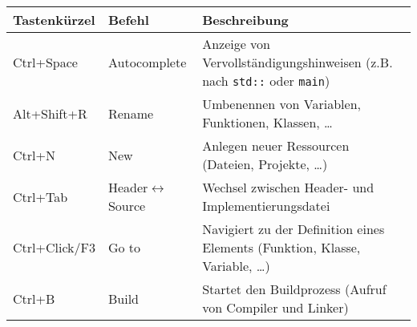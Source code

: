 \begin{tabular}{l|l|p{11.5cm}}
    \toprule
    \textbf{Tastenkürzel} & \textbf{Befehl} & \textbf{Beschreibung}\\
    \midrule
	Ctrl+Space & Autocomplete &
	Anzeige von Vervollständigungshinweisen (z.B. nach \texttt{std::} oder \texttt{main})
	\\
	Alt+Shift+R & Rename &
	Umbenennen von Variablen, Funktionen, Klassen, \dots
	\\
	Ctrl+N & New &
	Anlegen neuer Ressourcen (Dateien, Projekte, \dots)
	\\
	Ctrl+Tab & Header$\leftrightarrow$Source &
	Wechsel zwischen Header- und Implementierungsdatei
	\\
	Ctrl+Click/F3 & Go to &
	Navigiert zu der Definition eines Elements (Funktion, Klasse, Variable, \dots)
	\\
	Ctrl+B & Build &
	Startet den Buildprozess (Aufruf von Compiler und Linker)
    \\\bottomrule
\end{tabular}

